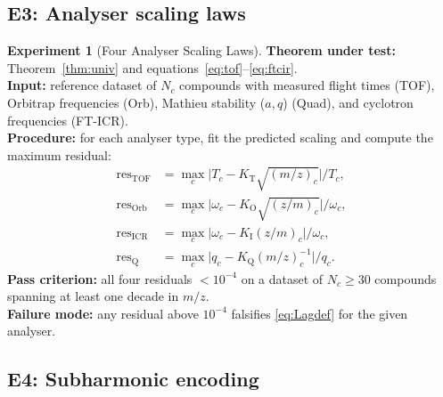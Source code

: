 \documentclass[twocolumn,10pt,a4paper]{article}
\theoremstyle{thmstyle}
\theoremstyle{definition}
\newtheorem{experiment}[theorem]{Experiment}
\theoremstyle{remark}
\begin{document}
\subsection{E3: Analyser scaling laws}

\begin{experiment}[Four Analyser Scaling Laws]
\label{exp:e3}
\textbf{Theorem under test:} Theorem~\ref{thm:univ} and
equations~\eqref{eq:tof}--\eqref{eq:ftcir}.\\
\textbf{Input:} reference dataset of $N_{c}$ compounds with measured
flight times (TOF), Orbitrap frequencies (Orb), Mathieu stability
($a,q$) (Quad), and cyclotron frequencies (FT-ICR).\\
\textbf{Procedure:} for each analyser type, fit the predicted
scaling and compute the maximum residual:
\begin{align*}
\mathrm{res}_{\mathrm{TOF}}&=\max_{c}\bigl|T_{c}-K_{\mathrm{T}}\sqrt{(m/z)_{c}}\bigr|/T_{c},\\
\mathrm{res}_{\mathrm{Orb}}&=\max_{c}\bigl|\omega_{c}-K_{\mathrm{O}}\sqrt{(z/m)_{c}}\bigr|/\omega_{c},\\
\mathrm{res}_{\mathrm{ICR}}&=\max_{c}\bigl|\omega_{c}-K_{\mathrm{I}}(z/m)_{c}\bigr|/\omega_{c},\\
\mathrm{res}_{\mathrm{Q}}&=\max_{c}\bigl|q_{c}-K_{\mathrm{Q}}(m/z)_{c}^{-1}\bigr|/q_{c}.
\end{align*}
\textbf{Pass criterion:} all four residuals $<10^{-4}$ on a dataset
of $N_{c}\geq 30$ compounds spanning at least one decade in $m/z$.\\
\textbf{Failure mode:} any residual above $10^{-4}$ falsifies
\eqref{eq:Lagdef} for the given analyser.
\end{experiment}

\subsection{E4: Subharmonic encoding}
\end{document}

